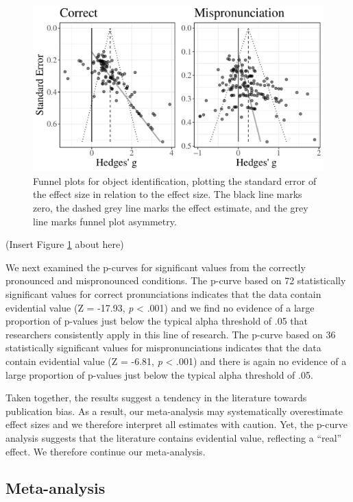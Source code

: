 \documentclass[man, noextraspace]{apa6}
\begin{document}
\begin{figure}
\centering
\includegraphics{VonHolzenBergmann_MPMetaAnalysis_files/figure-latex/FunnelCombo-1.pdf}
\caption{\label{fig:FunnelCombo}Funnel plots for object identification, plotting the standard error of the effect size in relation to the effect size. The black line marks zero, the dashed grey line marks the effect estimate, and the grey line marks funnel plot asymmetry.}
\end{figure}

(Insert Figure \ref{fig:FunnelCombo} about here)

We next examined the p-curves for significant values from the correctly pronounced and mispronounced conditions. The p-curve based on 72 statistically significant values for correct pronunciations indicates that the data contain evidential value (Z = -17.93, \emph{p} \textless{} .001) and we find no evidence of a large proportion of p-values just below the typical alpha threshold of .05 that researchers consistently apply in this line of research. The p-curve based on 36 statistically significant values for mispronunciations indicates that the data contain evidential value (Z = -6.81, \emph{p} \textless{} .001) and there is again no evidence of a large proportion of p-values just below the typical alpha threshold of .05.

Taken together, the results suggest a tendency in the literature towards publication bias. As a result, our meta-analysis may systematically overestimate effect sizes and we therefore interpret all estimates with caution. Yet, the p-curve analysis suggests that the literature contains evidential value, reflecting a \enquote{real} effect. We therefore continue our meta-analysis.

\hypertarget{meta-analysis-1}{%
\subsection{Meta-analysis}\label{meta-analysis-1}}
\end{document}
